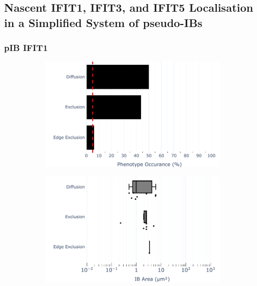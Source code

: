 \subsection{Nascent IFIT1, IFIT3, and IFIT5 Localisation in a Simplified System of pseudo-IBs} \label{subsec:Nascent IFIT1, IFIT3, and IFIT5 Localisation in a Simplified System of pseudo-IBs}
\subsubsection{pIB IFIT1}

\begin{figure}
    \begin{subfigure}{0.5\textwidth}
        \caption{}
        \includegraphics[width=1\linewidth]{09. Chapter 4/Figs/03. pIB/01. IFIT1/01. bar_i1_293t.pdf} 
    \end{subfigure}
    \begin{subfigure}{0.5\textwidth}
        \caption{}
        \includegraphics[width=1\linewidth]{09. Chapter 4/Figs/03. pIB/01. IFIT1/02. box_i1_293t.pdf}

\end{subfigure}
\end{figure}
